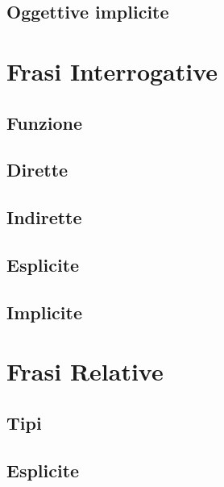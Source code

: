 \documentclass[a4paper,twoside,11pt,chapterprefix=false,bibliography=totocnumbered,listof=flat]{scrbook}
\begin{document}
\hypertarget{oggettive-implicite}{%
\section{Oggettive implicite}\label{oggettive-implicite}}

\hypertarget{frasi-interrogative}{%
\chapter{Frasi Interrogative}\label{frasi-interrogative}}

\hypertarget{funzione-2}{%
\section{Funzione}\label{funzione-2}}

\hypertarget{dirette}{%
\section{Dirette}\label{dirette}}

\hypertarget{indirette}{%
\section{Indirette}\label{indirette}}

\hypertarget{esplicite}{%
\section{Esplicite}\label{esplicite}}

\hypertarget{implicite}{%
\section{Implicite}\label{implicite}}

\hypertarget{frasi-relative}{%
\chapter{Frasi Relative}\label{frasi-relative}}

\hypertarget{tipi}{%
\section{Tipi}\label{tipi}}

\hypertarget{esplicite-1}{%
\section{Esplicite}\label{esplicite-1}}
\end{document}
